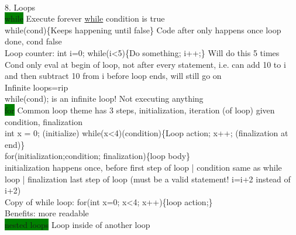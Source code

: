 ~\\ \color{Red}
8. Loops
\\ \colorbox{Green}{while} Execute forever \underline{while} condition is true
\\ while(cond)\{Keeps happening until false\} Code after only happens once loop done, cond false
\\ Loop counter: int i=0; while(i<5)\{Do something; i++;\} Will do this 5 times
\\ Cond only eval at begin of loop, not after every statement, i.e. can add 10 to i and then subtract 10 from i before loop ends, will still go on
\\ Infinite loops=rip
\\ while(cond); is an infinite loop! Not executing anything
\\ \colorbox{Green}{for} Common loop theme has 3 steps, initialization, iteration (of loop) given condition, finalization
\\ int x = 0; (initialize) while(x<4)(condition)\{Loop action; x++; (finalization at end)\}
\\ for(initialization;condition; finalization)\{loop body\}
\\ initialization happens once, before first step of loop | condition same as while loop | finalization last step of loop (must be a valid statement! i=i+2 instead of i+2)
\\ Copy of while loop: for(int x=0; x<4; x++)\{loop action;\}
\\ Benefits: more readable
\\ \colorbox{Green}{nested loops} Loop inside of another loop